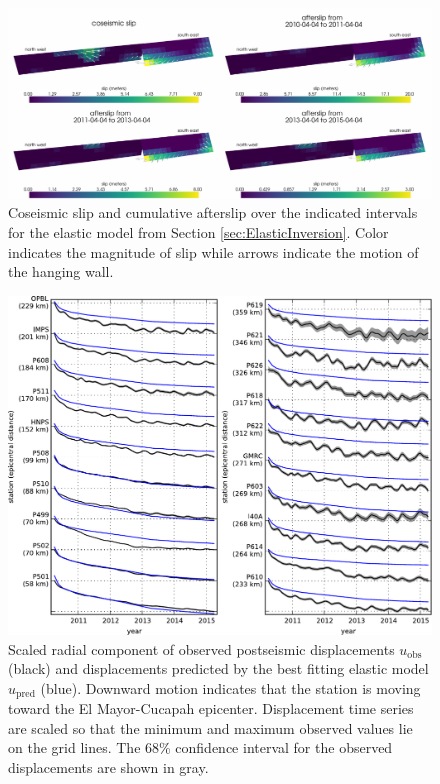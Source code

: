 \documentclass[draft,linenumbers]{AGUJournal}
\begin{document}
\begin{figure}
\includegraphics[scale=0.8]{Figures/ElasticSlip}
\caption{Coseismic slip and cumulative afterslip over the indicated intervals for the elastic model from Section \ref{sec:ElasticInversion}.  Color indicates the magnitude of slip while arrows indicate the motion of the hanging wall.}
\label{fig:ElasticSlip}
\end{figure}

\begin{figure}
\includegraphics[scale=0.8]{Figures/RecordSectionElastic}
\caption{Scaled radial component of observed postseismic displacements $u_\mathrm{obs}$ (black) and displacements predicted by the best fitting elastic model $u_\mathrm{pred}$ (blue).  Downward motion indicates that the station is moving toward the El Mayor-Cucapah epicenter.  Displacement time series are scaled so that the minimum and maximum observed values lie on the grid lines.  The 68\% confidence interval for the observed displacements are shown in gray.}
\label{fig:RecordSectionElastic}
\end{figure}
\end{document}
